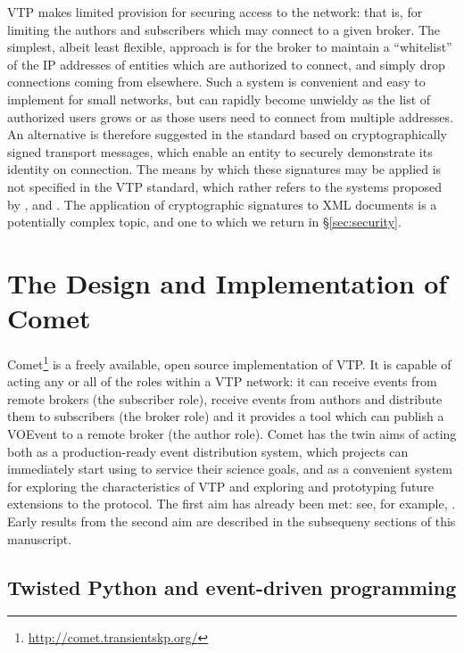 \documentclass[5p,authoryear]{elsarticle}
\begin{document}
VTP makes limited provision for securing access to the network: that is, for
limiting the authors and subscribers which may connect to a given broker. The
simplest, albeit least flexible, approach is for the broker to maintain a
``whitelist'' of the IP addresses of entities which are authorized to connect,
and simply drop connections coming from elsewhere. Such a system is convenient
and easy to implement for small networks, but can rapidly become unwieldy as
the list of authorized users grows or as those users need to connect from
multiple addresses. An alternative is therefore suggested in the standard
based on cryptographically signed transport messages, which enable an entity
to securely demonstrate its identity on connection. The means by which these
signatures may be applied is not specified in the VTP standard, which rather
refers to the systems proposed by \citet{Denny:2008}, \citet{Allen:2008} and
\citet{Rixon:2005}. The application of cryptographic signatures to XML
documents is a potentially complex topic, and one to which we return in
\S\ref{sec:security}.

\section{The Design and Implementation of Comet}
\label{sec:design}

Comet\footnote{\url{http://comet.transientskp.org/}} is a freely available,
open source implementation of VTP. It is capable of acting any or all of the
roles within a VTP network: it can receive events from remote brokers (the
subscriber role), receive events from authors and distribute them to
subscribers (the broker role) and it provides a tool which can publish a
VOEvent to a remote broker (the author role). Comet has the twin aims of
acting both as a production-ready event distribution system, which projects
can immediately start using to service their science goals, and as a
convenient system for exploring the characteristics of VTP and exploring and
prototyping future extensions to the protocol. The first aim has already been
met: see, for example, \citet{Staley:2013}. Early results from the second aim
are described in the subsequeny sections of this manuscript.

\subsection{Twisted Python and event-driven programming}
\label{sec:design:twisted}
\end{document}
